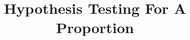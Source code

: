 \documentclass{beamer}
\title[MA205 - Section 5.3]{Hypothesis Testing For A Proportion}
\begin{document}
\begin{frame}
  \titlepage
\end{frame}
\end{document}
